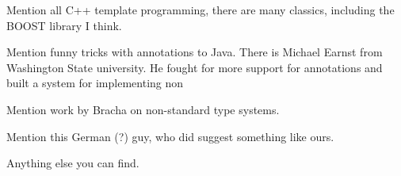 Mention all C++ template programming, there are many classics, including the BOOST library I think. 

Mention funny tricks with annotations to Java. There is Michael Earnst from 
  Washington State university. He fought for more support for annotations 
  and built a system for implementing non

Mention work by Bracha on non-standard type systems.  

Mention this German (?) guy, who did suggest something like ours.  

Anything else you can find.

